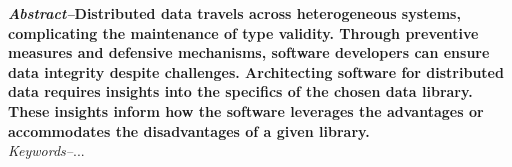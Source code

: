 \documentclass[../report.tex]{subfiles}
\begin{document}
{\textbf{\textit{Abstract--}Distributed data travels across heterogeneous systems, complicating the maintenance of type validity. Through preventive measures and defensive mechanisms, software developers can ensure data integrity despite challenges. Architecting software for distributed data requires insights into the specifics of the chosen data library. These insights inform how the software leverages the advantages or accommodates the disadvantages of a given library.}} \\

\textit{Keywords--}...
\end{document}
